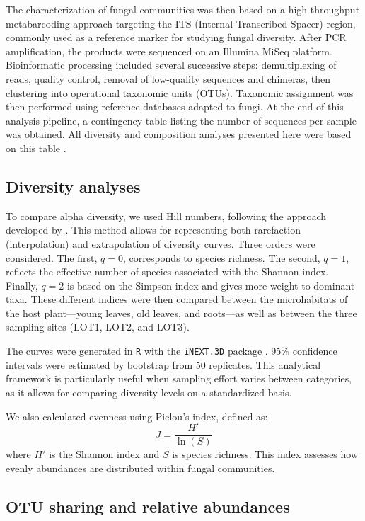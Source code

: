 \documentclass[alpha-refs,twocolumn]{wiley-article}
\begin{document}
The characterization of fungal communities was then based on a high-throughput metabarcoding approach targeting the ITS (Internal Transcribed Spacer) region, commonly used as a reference marker for studying fungal diversity. After PCR amplification, the products were sequenced on an Illumina MiSeq platform. Bioinformatic processing included several successive steps: demultiplexing of reads, quality control, removal of low-quality sequences and chimeras, then clustering into operational taxonomic units (OTUs). Taxonomic assignment was then performed using reference databases adapted to fungi. At the end of this analysis pipeline, a contingency table listing the number of sequences per sample was obtained. All diversity and composition analyses presented here were based on this table \citep{leponce2024unveiling}.

\subsection{Diversity analyses}

To compare alpha diversity, we used Hill numbers, following the approach developed by \citet{chao2014rarefaction}. This method allows for representing both rarefaction (interpolation) and extrapolation of diversity curves. Three orders were considered. The first, \(q=0\), corresponds to species richness. The second, \(q=1\), reflects the effective number of species associated with the Shannon index. Finally, \(q=2\) is based on the Simpson index and gives more weight to dominant taxa. These different indices were then compared between the microhabitats of the host plant—young leaves, old leaves, and roots—as well as between the three sampling sites (LOT1, LOT2, and LOT3).

The curves were generated in \texttt{R} with the \texttt{iNEXT.3D} package \citep{chao2021measuring}. 95\% confidence intervals were estimated by bootstrap from 50 replicates. This analytical framework is particularly useful when sampling effort varies between categories, as it allows for comparing diversity levels on a standardized basis.

We also calculated evenness using Pielou's index, defined as:
\[ J = \frac{H'}{\ln(S)} \]
where \(H'\) is the Shannon index and \(S\) is species richness. This index assesses how evenly abundances are distributed within fungal communities.

\subsection{OTU sharing and relative abundances}
\end{document}
